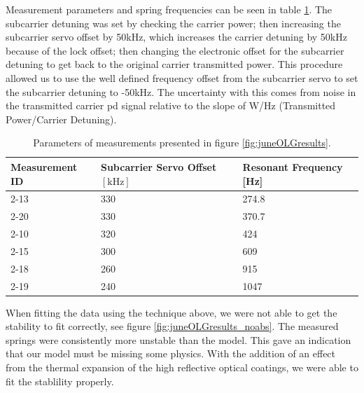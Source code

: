 Measurement parameters and spring frequencies can be seen in table
\ref{tab:experiment2params}.
The subcarrier detuning was set by checking the carrier power; then increasing
the subcarrier servo offset by 50kHz, which increases the carrier detuning by
50kHz because of the lock offset;
then changing the electronic offset for the subcarrier detuning to get back to
the original carrier transmitted power.
This procedure allowed us to use the well defined frequency offset from the
subcarrier servo to set the subcarrier detuning to -50kHz. The uncertainty
with this comes from noise in the transmitted carrier \ac{pd} signal relative
to the slope of W/Hz (Transmitted Power/Carrier Detuning).



\begin{table}
  \begin{center}
    \small
    \begin{tabular}{|l|l|l|}
      \hline
      Measurement ID & Subcarrier Servo Offset $[\mathrm{kHz}]$ & Resonant Frequency [Hz] \\
      \hline
      \hline
      2-13 & 330  & 274.8 \\
      2-20 & 330  & 370.7 \\
      2-10 & 320  & 424 \\
      2-15 & 300  & 609 \\
      2-18 & 260  & 915 \\
      2-19 & 240  & 1047 \\
      \hline
    \end{tabular}
  \end{center}
  \caption[Optical Trap, 2nd Edition Spring Measurements]{
      Parameters of measurements presented in figure \ref{fig:juneOLGresults}.
      }
  \label{tab:experiment2params}
\end{table}

When fitting the data using the technique above, we were not able to get the
stability to fit correctly, see figure \ref{fig:juneOLGresults_noabs}.
The measured springs were consistently more unstable than the model.
This gave an indication that our model must be missing some physics.
With the addition of an effect from the thermal expansion of the high
reflective optical coatings, we were able to fit the stablility
properly.


